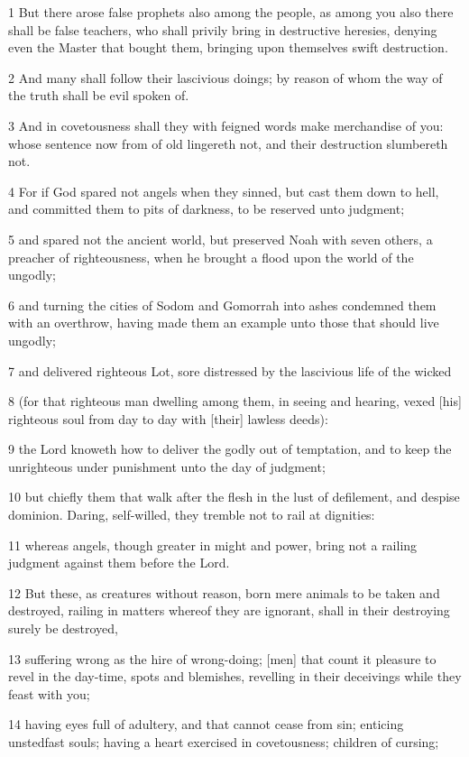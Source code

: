 \par 1 But there arose false prophets also among the people, as among you also there shall be false teachers, who shall privily bring in destructive heresies, denying even the Master that bought them, bringing upon themselves swift destruction.
\par 2 And many shall follow their lascivious doings; by reason of whom the way of the truth shall be evil spoken of.
\par 3 And in covetousness shall they with feigned words make merchandise of you: whose sentence now from of old lingereth not, and their destruction slumbereth not.
\par 4 For if God spared not angels when they sinned, but cast them down to hell, and committed them to pits of darkness, to be reserved unto judgment;
\par 5 and spared not the ancient world, but preserved Noah with seven others, a preacher of righteousness, when he brought a flood upon the world of the ungodly;
\par 6 and turning the cities of Sodom and Gomorrah into ashes condemned them with an overthrow, having made them an example unto those that should live ungodly;
\par 7 and delivered righteous Lot, sore distressed by the lascivious life of the wicked
\par 8 (for that righteous man dwelling among them, in seeing and hearing, vexed [his] righteous soul from day to day with [their] lawless deeds):
\par 9 the Lord knoweth how to deliver the godly out of temptation, and to keep the unrighteous under punishment unto the day of judgment;
\par 10 but chiefly them that walk after the flesh in the lust of defilement, and despise dominion. Daring, self-willed, they tremble not to rail at dignities:
\par 11 whereas angels, though greater in might and power, bring not a railing judgment against them before the Lord.
\par 12 But these, as creatures without reason, born mere animals to be taken and destroyed, railing in matters whereof they are ignorant, shall in their destroying surely be destroyed,
\par 13 suffering wrong as the hire of wrong-doing; [men] that count it pleasure to revel in the day-time, spots and blemishes, revelling in their deceivings while they feast with you;
\par 14 having eyes full of adultery, and that cannot cease from sin; enticing unstedfast souls; having a heart exercised in covetousness; children of cursing;
